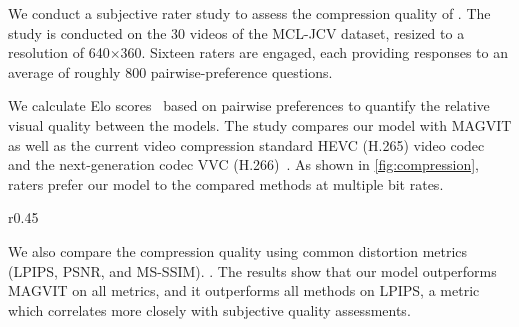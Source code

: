 We conduct a subjective rater study to assess the compression quality of \modelname{}. The study is conducted on the 30 videos of the MCL-JCV dataset, resized to a resolution of 640$\times$360.
Sixteen raters are engaged, each providing responses to an average of roughly 800 pairwise-preference questions.
\newpage

We calculate Elo scores~\citep{elo1978rating} based on pairwise preferences to quantify the relative visual quality between the models. The study compares our model with MAGVIT as well as the current video compression standard HEVC (H.265) video codec~\citep{sullivan2012overview} and the next-generation codec VVC (H.266)~\citep{vvc}. As shown in \cref{fig:compression}, raters prefer our model to the compared methods at multiple bit rates.

\begin{wraptable}{r}{0.45\textwidth}
\vspace{-10mm}
    \centering
    \caption{\textbf{Video compression metrics}.
    }
    \label{tab:compression}
    \vspace{-2mm}
    \vspace{-8mm}
\end{wraptable}

We also compare the compression quality using common distortion metrics (LPIPS, PSNR, and MS-SSIM). 
.
The results show that our model outperforms MAGVIT on all metrics, and it outperforms all methods on LPIPS, a metric which correlates more closely with subjective quality assessments.

